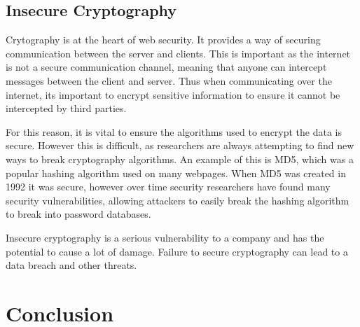 \subsection{Insecure Cryptography}

Crytography is at the heart of web security. It provides a way of securing communication between the server and clients. This is important as the internet is not a secure communication channel\cite{nisha_overview_2010}, meaning that anyone can intercept messages between the client and server. Thus when communicating over the internet, its important to encrypt sensitive information to ensure it cannot be intercepted by third parties.

For this reason, it is vital to ensure the algorithms used to encrypt the data is secure. However this is difficult, as researchers are always attempting to find new ways to break cryptography algorithms. An example of this is MD5, which was a popular hashing algorithm used on many webpages. When MD5 was created in 1992 it was secure, however over time security researchers have found many security vulnerabilities\cite{ora_data_2015}, allowing attackers to easily break the hashing algorithm to break into password databases.

Insecure cryptography is a serious vulnerability to a company and has the potential to cause a lot of damage. Failure to secure cryptography can lead to a data breach and other threats.

\section{Conclusion}
